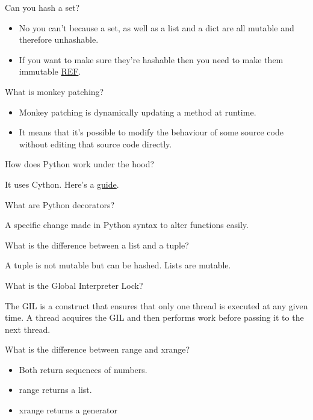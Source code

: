\begin{questions}
\question Can you hash a set?
\begin{solution}
\begin{itemize}
    \item No you can't because a set, as well as a list and a dict are all mutable and therefore unhashable.
    \item If you want to make sure they're hashable then you need to make them immutable \href{https://eng.lyft.com/hashing-and-equality-in-python-2ea8c738fb9d}{REF}.
\end{itemize}
\end{solution}

\question What is monkey patching?
\begin{solution}
\begin{itemize}
    \item Monkey patching is dynamically updating a method at runtime.
    \item It means that it's possible to modify the behaviour of some source code without editing that source code directly.
\end{itemize}
\end{solution}

\question How does Python work under the hood?
\begin{solution}
It uses Cython. Here's a \href{https://realpython.com/cpython-source-code-guide/}{guide}.
\end{solution}

\question What are Python decorators?
\begin{solution}
A specific change made in Python syntax to alter functions easily.
\end{solution}

\question What is the difference between a list and a tuple?
\begin{solution}
A tuple is not mutable but can be hashed. Lists are mutable.
\end{solution}

\question What is the Global Interpreter Lock?
\begin{solution}
The GIL is a construct that ensures that only one thread is executed at any given time. A thread acquires the GIL and then performs work before passing it to the next thread.
\end{solution}

\question What is the difference between range and xrange?
\begin{solution}
\begin{itemize}
    \item Both return sequences of numbers.
    \item range returns a list.
    \item xrange returns a generator
\end{itemize}
\end{solution}


\end{questions}
